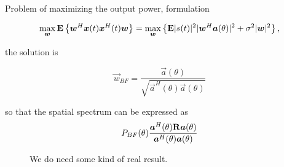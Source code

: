Problem of maximizing the output power, formulation 

\begin{equation}
	\max_{\bm{w}} \mathbf{E}\left\{\bm{w}^H\bm{x}(t)\bm{x}^H(t)\bm{w}\right\}  = \max_{\bm{w}}\left\{\mathbf{E}|s(t)|^2|\bm{w}^H\bm{a}(\theta)|^2+\sigma^2|\bm{w}|^2\right\}\\,
\end{equation}

the solution is

\begin{equation}
 \vec{w}_{BF} = \frac{\vec{a}(\theta)}{\sqrt{\vec{a}^H(\theta)\vec{a}(\theta)}}
\end{equation}

so that the spatial spectrum can be expressed as
\begin{equation}
	P_{BF}(\theta) \frac{\bm{a}^H(\theta)\mathbf{R}\bm{a}(\theta)}{\bm{a}^H(\theta)\bm{a}(\theta)}
\end{equation}

\begin{figure}[h!]
	\centering
	
	\caption{We do need some kind of real result.}
\end{figure} 
